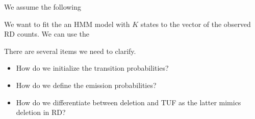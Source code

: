 We assume the following


We want to fit the an HMM model with $K$ states to the vector of the observed RD counts. We can use the 



There are several items we need to clarify. 

\begin{itemize}
\item How do we initialize the transition probabilities?
\item How do we define the emission probabilities?
\item How do we differentiate between deletion and TUF as the latter mimics deletion in RD?
\end{itemize}


